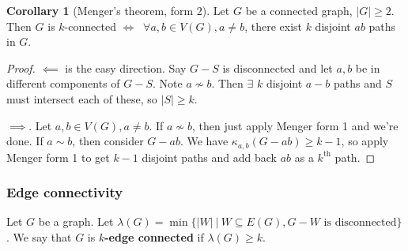 \documentclass{article}
\theoremstyle{definition}
\newtheorem{cor}[theorem]{Corollary}
\begin{document}
\begin{cor}[Menger's theorem, form 2]
    Let $G$ be a connected graph, $|G|\ge 2$. Then $G$ is $k$-connected $\iff$ $~\forall a,b \in V(G), a \neq b$, there exist $k$ disjoint $ab$ paths in $G$.
\end{cor}
\begin{proof}
    $\impliedby$ is the easy direction. Say $G-S$ is disconnected and let $a,b$ be in different components of $G-S$. Note $a \not\sim b$. Then $\exists $ $k$ disjoint $a-b$ paths and $S$ must intersect each of these, so $|S| \ge k$.

    $\implies $. Let $a,b \in V(G), a\neq b$. If $a \not\sim b$, then just apply Menger form 1 and we're done. If $a \sim b$, then consider $G-ab$. We have $\kappa_{a,b}(G-ab)\ge k-1$, so apply Menger form 1 to get $k-1$ disjoint paths and add back $ab$ as a $k^{\text{th}}$ path.
\end{proof}

\subsubsection{Edge connectivity}

Let $G$ be a graph. Let $\lambda(G) = \min \{|W| ~|~ W \subseteq E(G), G-W \text{ is disconnected}\}$. We say that $G$ is \textbf{$k$-edge connected} if $\lambda(G) \ge k$. 

\end{document}
